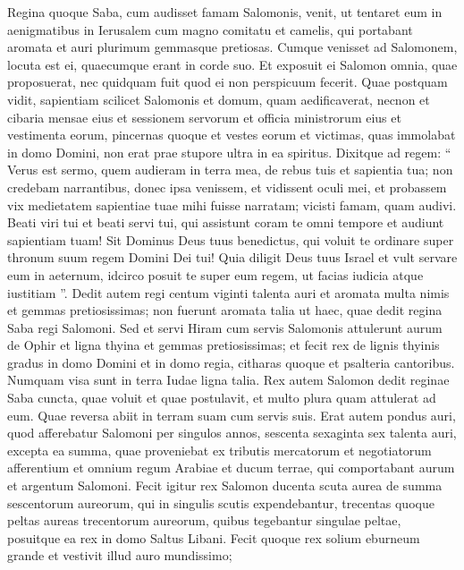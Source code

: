 \begin{biblechapter}
\begin{biblechapter}
\begin{biblechapter}
\begin{biblechapter}
\begin{biblechapter}
\begin{biblechapter}
\begin{biblechapter}
\begin{biblechapter}
\begin{biblechapter}
\verse Regina quoque Saba, cum audisset famam Salomonis, venit, ut tentaret eum in aenigmatibus in Ierusalem cum magno comitatu et camelis, qui portabant aromata et auri plurimum gemmasque pretiosas. Cumque venisset ad Salomonem, locuta est ei, quaecumque erant in corde suo. 
\verse Et exposuit ei Salomon omnia, quae proposuerat, nec quidquam fuit quod ei non perspicuum fecerit.
 \verse Quae postquam vidit, sapientiam scilicet Salomonis et domum, quam aedificaverat, 
\verse necnon et cibaria mensae eius et sessionem servorum et officia ministrorum eius et vestimenta eorum, pincernas quoque et vestes eorum et victimas, quas immolabat in domo Domini, non erat prae stupore ultra in ea spiritus. 
\verse Dixitque ad regem: “ Verus est sermo, quem audieram in terra mea, de rebus tuis et sapientia tua; 
\verse non credebam narrantibus, donec ipsa venissem, et vidissent oculi mei, et probassem vix medietatem sapientiae tuae mihi fuisse narratam; vicisti famam, quam audivi. 
\verse Beati viri tui et beati servi tui, qui assistunt coram te omni tempore et audiunt sapientiam tuam! 
\verse Sit Dominus Deus tuus benedictus, qui voluit te ordinare super thronum suum regem Domini Dei tui! Quia diligit Deus tuus Israel et vult servare eum in aeternum, idcirco posuit te super eum regem, ut facias iudicia atque iustitiam ”. 
\verse Dedit autem regi centum viginti talenta auri et aromata multa nimis et gemmas pretiosissimas; non fuerunt aromata talia ut haec, quae dedit regina Saba regi Salomoni.
 \verse Sed et servi Hiram cum servis Salomonis attulerunt aurum de Ophir et ligna thyina et gemmas pretiosissimas; 
\verse et fecit rex de lignis thyinis gradus in domo Domini et in domo regia, citharas quoque et psalteria cantoribus. Numquam visa sunt in terra Iudae ligna talia.
 \verse Rex autem Salomon dedit reginae Saba cuncta, quae voluit et quae postulavit, et multo plura quam attulerat ad eum. Quae reversa abiit in terram suam cum servis suis.
 \verse Erat autem pondus auri, quod afferebatur Salomoni per singulos annos, sescenta sexaginta sex talenta auri, 
\verse excepta ea summa, quae proveniebat ex tributis mercatorum et negotiatorum afferentium et omnium regum Arabiae et ducum terrae, qui comportabant aurum et argentum Salomoni.
 \verse Fecit igitur rex Salomon ducenta scuta aurea de summa sescentorum aureorum, qui in singulis scutis expendebantur, 
\verse trecentas quoque peltas aureas trecentorum aureorum, quibus tegebantur singulae peltae, posuitque ea rex in domo Saltus Libani.
 \verse Fecit quoque rex solium eburneum grande et vestivit illud auro mundissimo; 

\end{biblechapter}
\end{biblechapter}
\end{biblechapter}
\end{biblechapter}
\end{biblechapter}
\end{biblechapter}
\end{biblechapter}
\end{biblechapter}
\end{biblechapter}
